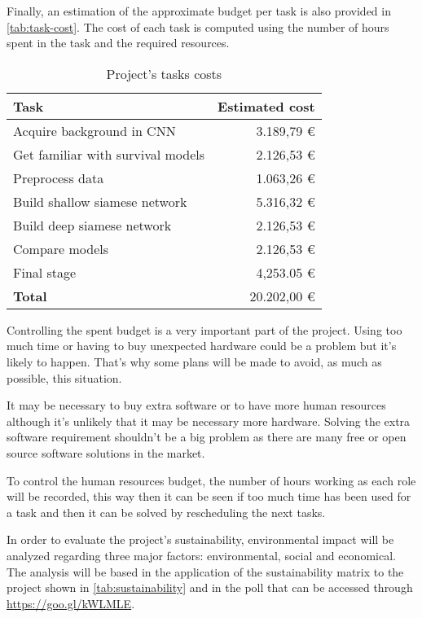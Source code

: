 Finally, an estimation of the approximate budget per task is also provided in 
\autoref{tab:task-cost}. The cost of each task is computed using the number of hours spent 
in the task and the required resources.

\begin{table}[H]
  \centering
  \begin{tabular}{|l|r|}
    \hline
    \textbf{Task} & \textbf{Estimated cost} \\ 
    \hline\hline

    Acquire background in CNN & 3.189,79 € \\ \hline
    Get familiar with survival models & 2.126,53 € \\ \hline
    Preprocess data & 1.063,26 € \\ \hline
    Build shallow siamese network & 5.316,32 € \\ \hline
    Build deep siamese network & 2.126,53 € \\ \hline
    Compare models & 2.126,53 € \\ \hline
    Final stage & 4,253.05 € \\ 

    \hline\hline
    \textbf{Total} & 20.202,00 € \\ \hline
  \end{tabular}

  \caption{Project's tasks costs \label{tab:task-cost}}
\end{table}


Controlling the spent budget is a very important part of the project. Using too much time or 
having to buy unexpected hardware could be a problem but it's likely to happen. That's why
some plans will be made to avoid, as much as possible, this situation.

It may be necessary to buy extra software or to have more human resources although it's
unlikely that it may be necessary more hardware. Solving the extra software requirement
shouldn't be a big problem as there are many free or open source software solutions in
the market.

To control the human resources budget, the number of hours working as each role will be 
recorded, this way then it can be seen if too much time has been used for a task and then
it can be solved by rescheduling the next tasks.


In order to evaluate the project's sustainability, environmental impact will be analyzed
regarding three major factors: environmental, social and economical. The analysis will be 
based in the application of the sustainability matrix to the project shown in
\autoref{tab:sustainability} and in the poll that can be accessed through 
\url{https://goo.gl/kWLMLE}.

